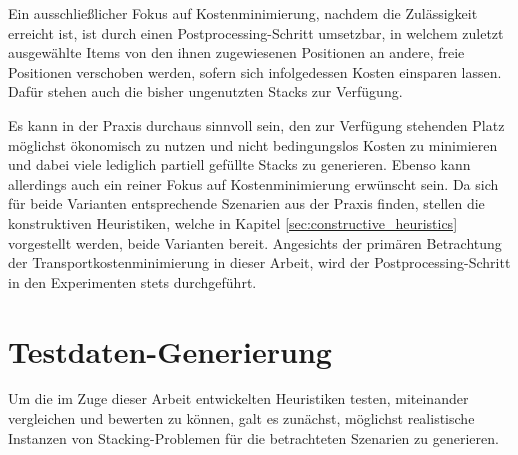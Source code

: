 Ein ausschließlicher Fokus auf Kostenminimierung, nachdem die Zulässigkeit erreicht ist, ist durch
einen Postprocessing-Schritt umsetzbar, in welchem zuletzt ausgewählte Items von den ihnen zugewiesenen Positionen
an andere, freie Positionen verschoben werden, sofern sich infolgedessen Kosten einsparen lassen.
Dafür stehen auch die bisher ungenutzten Stacks zur Verfügung.

Es kann in der Praxis durchaus sinnvoll sein, den zur Verfügung stehenden Platz möglichst ökonomisch zu nutzen
und nicht bedingungslos Kosten zu minimieren und dabei viele lediglich partiell gefüllte Stacks zu generieren.
Ebenso kann allerdings auch ein reiner Fokus auf Kostenminimierung erwünscht sein. Da sich für beide Varianten
entsprechende Szenarien aus der Praxis finden, stellen die konstruktiven Heuristiken,
welche in Kapitel \ref{sec:constructive_heuristics} vorgestellt werden, beide Varianten bereit.
Angesichts der primären Betrachtung der Transportkostenminimierung in dieser Arbeit,
wird der Postprocessing-Schritt in den Experimenten stets durchgeführt.

\section{Testdaten-Generierung}
\label{sec:test_data}

Um die im Zuge dieser Arbeit entwickelten Heuristiken testen, miteinander vergleichen
und bewerten zu können, galt es zunächst, möglichst realistische Instanzen von Stacking-Problemen
für die betrachteten Szenarien zu generieren.

